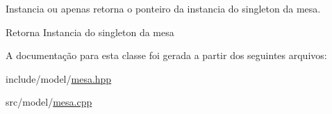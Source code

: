 Instancia ou apenas retorna o ponteiro da instancia do singleton da mesa. 

\begin{DoxyReturn}{Retorna}
Instancia do singleton da mesa 
\end{DoxyReturn}


A documentação para esta classe foi gerada a partir dos seguintes arquivos:\begin{DoxyCompactItemize}
\item 
include/model/\hyperlink{mesa_8hpp}{mesa.hpp}\item 
src/model/\hyperlink{mesa_8cpp}{mesa.cpp}\end{DoxyCompactItemize}
